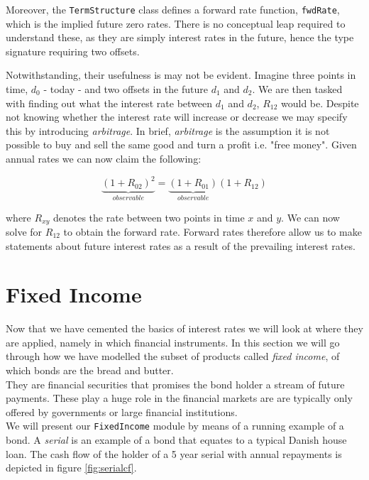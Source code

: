 Moreover, the \texttt{TermStructure} class defines a forward rate function,
\texttt{fwdRate}, which is the implied future zero rates. There is no
conceptual leap required to understand these, as they are simply interest
rates in the future, hence the type signature requiring two offsets.

Notwithstanding, their usefulness is may not be evident. 
Imagine three points in time, $d_0$ - today - and two
offsets in the future $d_1$ and $d_2$. We are then tasked with finding out
what the interest rate between $d_1$ and $d_2$, $R_{12}$ would be. Despite not 
knowing whether the interest rate will increase or decrease we may specify 
this by introducing \emph{arbitrage}. In brief, \emph{arbitrage} is the
assumption it is not possible to buy and sell the same good and turn a 
profit i.e. "free money". Given annual rates we can now claim the following:

\begin{equation}
\underbrace{(1+R_{02})^2}_{observable} = \underbrace{(1+R_{01})}_{observable}(1 + R_{12})
\end{equation}

where $R_{xy}$ denotes the rate between two points in time $x$ and $y$. We
can now solve for $R_{12}$ to obtain the forward rate. Forward rates therefore
allow us to make statements about future interest rates as a result of the
prevailing interest rates.


\section{Fixed Income}

Now that we have cemented the basics of interest rates we will look at 
where they are applied, namely in which financial instruments. In this section
we will go through how we have modelled the subset of products called 
\emph{fixed income}, of which bonds are the bread and butter.\\
They are financial securities that promises the bond holder a
stream of future payments. These play a huge role in the financial markets are
are typically only offered by governments or large financial institutions.\\

We will present our \texttt{FixedIncome} module by means of a running example
of a bond. 
A \emph{serial} is an example of a bond that equates to a typical Danish house
loan. The cash flow of the holder of a 5 year serial with annual repayments is
depicted in figure \ref{fig:serialcf}.\\

